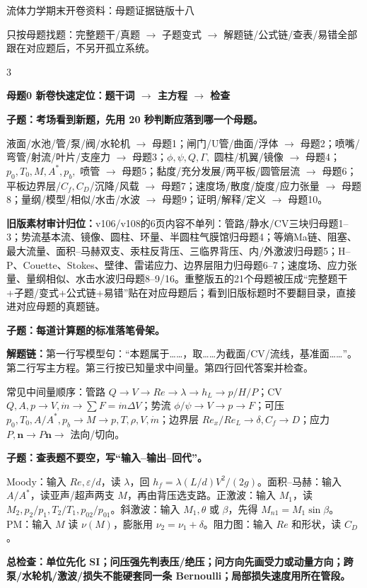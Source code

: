 \documentclass[a4paper]{article}
\newcommand{\mt}[1]{\vspace{0.22pt}\colorbox{M}{\parbox{\dimexpr\linewidth-2\fboxsep}{\color{white}\bfseries #1}}\par}
\newcommand{\qt}[1]{\vspace{0.10pt}\colorbox{Q}{\parbox{\dimexpr\linewidth-2\fboxsep}{\color{white}\bfseries #1}}\par}
\newcommand{\ans}[1]{\colorbox{G}{\parbox{\dimexpr\linewidth-2\fboxsep}{#1}}\par}
\newcommand{\warn}[1]{\colorbox{Y}{\parbox{\dimexpr\linewidth-2\fboxsep}{\color{E}\bfseries #1}}\par}
\newcommand{\chain}[1]{{\color{A}\bfseries 解题链：}#1\par}
\begin{document}
\fontsize{3.08}{3.22}\selectfont
\begin{center}
{\heiti\fontsize{6.1}{6.35}\selectfont 流体力学期末开卷资料：母题证据链版十八}\par
{\fontsize{3.20}{3.38}\selectfont 只按母题找题：完整题干/真题 $\to$ 子题变式 $\to$ 解题链/公式链/查表/易错全部跟在对应题后，不另开孤立系统。}
\end{center}
\vspace{-3.4pt}
\begin{multicols}{3}

\mt{母题0 新卷快速定位：题干词 $\to$ 主方程 $\to$ 检查}
\qt{子题：考场看到新题，先用 20 秒判断应落到哪一个母题。}
\ans{液面/水池/管/泵/阀/水轮机 $\to$ 母题1；闸门/U管/曲面/浮体 $\to$ 母题2；喷嘴/弯管/射流/叶片/支座力 $\to$ 母题3；$\phi,\psi,Q,\Gamma,$ 圆柱/机翼/镜像 $\to$ 母题4；$p_0,T_0,M,A^*,p_b,$ 喷管 $\to$ 母题5；黏度/充分发展/两平板/圆管层流 $\to$ 母题6；平板边界层/$C_f,C_D$/沉降/风载 $\to$ 母题7；速度场/散度/旋度/应力张量 $\to$ 母题8；量纲/模型/相似/水击/水波 $\to$ 母题9；证明/解释/定义 $\to$ 母题10。}
\ans{\textbf{旧版素材审计归位：}v106/v108的6页内容不单列：管路/静水/CV三块归母题1--3；势流基本流、镜像、圆柱、环量、半圆柱气膜馆归母题4；等熵Ma链、阻塞、最大流量、面积--马赫双支、汞柱反背压、三临界背压、内/外激波归母题5；H--P、Couette、Stokes、壁律、雷诺应力、边界层阻力归母题6--7；速度场、应力张量、量纲相似、水击水波归母题8--9/16。重整版五的21个母题被压成“完整题干+子题/变式+公式链+易错”贴在对应母题后；看到旧版标题时不要翻目录，直接进对应母题的真题链。}
\qt{子题：每道计算题的标准落笔骨架。}
\chain{第一行写模型句：“本题属于……，取……为截面/CV/流线，基准面……”。第二行写主方程。第三行按已知量求中间量。第四行回代答案并检查。}
\ans{常见中间量顺序：管路 $Q\to V\to Re\to\lambda\to h_L\to p/H/P$；CV $Q,A,p\to V,\dot m\to \sum F=\dot m\Delta V$；势流 $\phi/\psi\to V\to p\to F$；可压 $p_0,T_0,A/A^*,p_b\to M\to p,T,\rho,V,\dot m$；边界层 $Re_x/Re_L\to\delta,C_f\to D$；应力 $P,\bm n\to P\bm n\to$ 法向/切向。}
\qt{子题：查表题不要空，写“输入--输出--回代”。}
\ans{Moody：输入 $Re,\varepsilon/d$，读 $\lambda$，回 $h_f=\lambda(L/d)V^2/(2g)$。面积--马赫：输入 $A/A^*$，读亚声/超声两支 $M$，再由背压选支路。正激波：输入 $M_1$，读 $M_2,p_2/p_1,T_2/T_1,p_{02}/p_{01}$。斜激波：输入 $M_1,\theta$ 或 $\beta$，先得 $M_{n1}=M_1\sin\beta$。PM：输入 $M$ 读 $\nu(M)$，膨胀用 $\nu_2=\nu_1+\delta$。阻力图：输入 $Re$ 和形状，读 $C_D$。}
\warn{总检查：单位先化 SI；问压强先判表压/绝压；问方向先画受力或动量方向；跨泵/水轮机/激波/损失不能硬套同一条 Bernoulli；局部损失速度用所在管段。}



\end{multicols}
\end{document}
